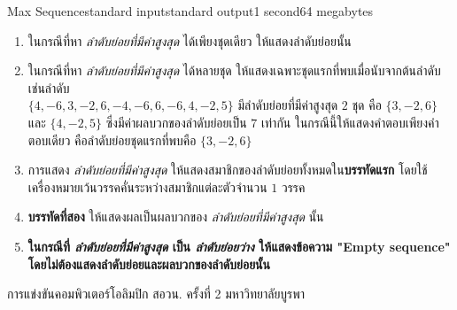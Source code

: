 \documentclass[11pt,a4paper]{article}
\begin{document}
\begin{problem}{Max Sequence}{standard input}{standard output}{1 second}{64 megabytes}
\begin{enumerate}
\item ในกรณีที่หา \textit{ลำดับย่อยที่มีค่าสูงสุด} ได้เพียงชุดเดียว ให้แสดงลำดับย่อยนั้น
\item ในกรณีที่หา \textit{ลำดับย่อยที่มีค่าสูงสุด} ได้หลายชุด ให้แสดงเฉพาะชุดแรกที่พบเมื่อนับจากต้นลำดับ เช่นลำดับ\\ $\{4, -6, 3, -2, 6, -4, -6, 6, -6, 4, -2, 5\}$ มีลำดับย่อยที่มีค่าสูงสุด $2$ ชุด คือ $\{3, -2, 6\}$ และ $\{4, -2, 5\}$ ซึ่งมีค่าผลบวกของลำดับย่อยเป็น $7$ เท่ากัน ในกรณีนี้ให้แสดงคำตอบเพียงคำตอบเดียว คือลำดับย่อยชุดแรกที่พบคือ $\{3, -2, 6\}$ \newpage
\item การแสดง \textit{ลำดับย่อยที่มีค่าสูงสุด} ให้แสดงสมาชิกของลำดับย่อยทั้งหมดใน\textbf{บรรทัดแรก} โดยใช้เครื่องหมายเว้นวรรคคั่นระหว่างสมาชิกแต่ละตัวจำนวน $1$ วรรค
\item \textbf{บรรทัดที่สอง} ให้แสดงผลเป็นผลบวกของ \textit{ลำดับย่อยที่มีค่าสูงสุด} นั้น
\item \textbf{ในกรณีที่ \textit{ลำดับย่อยที่มีค่าสูงสุด} เป็น \textit{ลำดับย่อยว่าง} ให้แสดงข้อความ "Empty sequence" โดยไม่ต้องแสดงลำดับย่อยและผลบวกของลำดับย่อยนั้น}
\end{enumerate}

\Examples

\begin{example}
%
%
\end{example}

\Source

การแข่งขันคอมพิวเตอร์โอลิมปิก สอวน. ครั้งที่ 2 มหาวิทยาลัยบูรพา

\end{problem}
\end{document}
